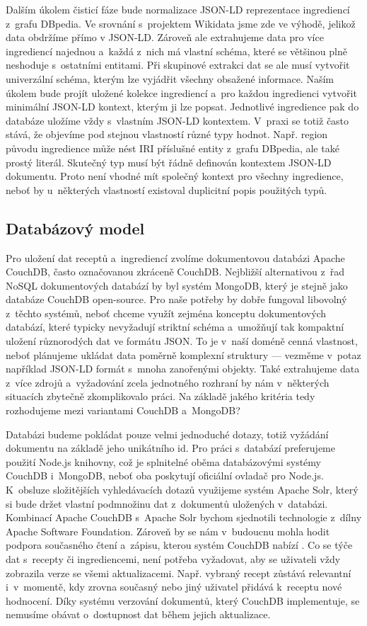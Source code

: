 Dalším úkolem čisticí fáze bude normalizace JSON-LD reprezentace ingrediencí z~grafu DBpedia. Ve srovnání s~projektem Wikidata jsme zde ve výhodě, jelikož data obdržíme přímo v JSON-LD. Zároveň ale extrahujeme data pro více ingrediencí najednou a~každá z~nich má vlastní schéma, které se většinou plně neshoduje s~ostatními entitami. Při skupinové extrakci dat se ale musí vytvořit univerzální schéma, kterým lze vyjádřit všechny obsažené informace. Naším úkolem bude projít uložené kolekce ingrediencí a~pro každou ingredienci vytvořit minimální JSON-LD kontext, kterým ji lze popsat. Jednotlivé ingredience pak do databáze uložíme vždy s~vlastním JSON-LD kontextem. V~praxi se totiž často stává, že objevíme pod stejnou vlastností různé typy hodnot. Např. region původu ingredience může nést IRI příslušné entity z~grafu DBpedia, ale také prostý literál. Skutečný typ musí být řádně definován kontextem JSON-LD dokumentu. Proto není vhodné mít společný kontext pro všechny ingredience, neboť by u~některých vlastností existoval duplicitní popis použitých typů.

\subsection{Databázový model}

Pro uložení dat receptů a~ingrediencí zvolíme dokumentovou databázi Apache CouchDB, často označovanou zkráceně CouchDB. Nejbližší alternativou z~řad NoSQL dokumentových databází by byl systém MongoDB, který je stejně jako databáze CouchDB open-source. Pro naše potřeby by dobře fungoval libovolný z~těchto systémů, neboť chceme využít zejména konceptu dokumentových databází, které typicky nevyžadují striktní schéma a~umožňují tak kompaktní uložení různorodých dat ve formátu JSON. To je v~naší doméně cenná vlastnost, neboť plánujeme ukládat data poměrně komplexní struktury --- vezměme v~potaz například JSON-LD formát s~mnoha zanořenými objekty. Také extrahujeme data z~více zdrojů a~vyžadování zcela jednotného rozhraní by nám v~některých situacích zbytečně zkomplikovalo práci. Na základě jakého kritéria tedy rozhodujeme mezi variantami CouchDB a~MongoDB?

Databázi budeme pokládat pouze velmi jednoduché dotazy, totiž vyžádání dokumentu na základě jeho unikátního id. Pro práci s~databází preferujeme použití Node.js knihovny, což je splnitelné oběma databázovými systémy CouchDB i~MongoDB, neboť oba poskytují oficiální ovladač pro Node.js. K~obsluze složitějších vyhledávacích dotazů využijeme systém Apache Solr, který si bude držet vlastní podmnožinu dat z~dokumentů uložených v~databázi. Kombinací Apache CouchDB s~Apache Solr bychom sjednotili technologie z~dílny Apache Software Foundation. Zároveň by se nám v~budoucnu mohla hodit podpora současného čtení a~zápisu, kterou systém CouchDB nabízí \citep{mongodb-vs-couchdb}. Co se týče dat s~recepty či ingrediencemi, není potřeba vyžadovat, aby se uživateli vždy zobrazila verze se všemi aktualizacemi. Např. vybraný recept zůstává relevantní i~v~momentě, kdy zrovna současný nebo jiný uživatel přidává k~receptu nové hodnocení. Díky systému verzování dokumentů, který CouchDB implementuje, se nemusíme obávat o~dostupnost dat během jejich aktualizace.

